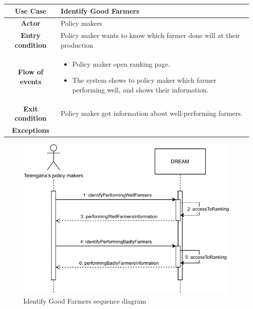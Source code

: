 \documentclass[../../main.tex]{subfiles}
\begin{document}
      \begin{table}[H]
        \centering
          \begin{tabular}{c m{}}
          \hline
          \textbf{Use Case} & Identify Good Farmers\\ \hline
          \textbf{Actor} & Policy makers\\ \hline
          \textbf{Entry condition} & Policy maker wants to know which farmer done will at their production\\  \hline
          \textbf{Flow of events} & \begin{itemize}
                                      \item Policy maker open ranking page.
                                      \item The system shows to policy maker which farmer performing well, and shows their information.
                                    \end{itemize}\\ \hline
          \textbf{Exit condition} & Policy maker got information about well-performing farmers. \\ \hline
          \textbf{Exceptions} & \\ \hline
          \end{tabular}
      \end{table}

      \begin{figure}[H]
        \centering
        \includegraphics[width=\textwidth]{RASD/image/Sequence_Diagram_Policy_maker-IdetifyGoodFarmers.drawio.pdf}
        \caption{Identify Good Farmers sequence diagram}
      \end{figure}
\end{document}
